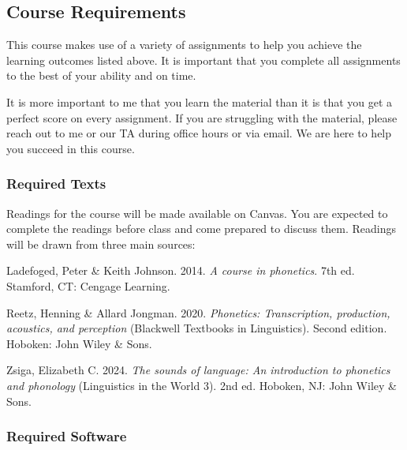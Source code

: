 \documentclass[12pt, letterpaper]{article}
\begin{document}
\subsection*{Course Requirements} \label{sec:requirements}

This course makes use of a variety of assignments to help you achieve the learning outcomes listed above. It is important that you complete all assignments to the best of your ability and on time. 

It is more important to me that you learn the material than it is that you get a perfect score on every assignment. If you are struggling with the material, please reach out to me or our TA during office hours or via email. We are here to help you succeed in this course.

\subsubsection*{Required Texts} \label{sec:texts}
Readings for the course will be made available on Canvas. You are expected to complete the readings before class and come prepared to discuss them. Readings will be drawn from three main sources: 
\begin{description}[style=multiline, leftmargin=6cm,font=\bfseries]
    \item[Ladefoged and Johnson (L\&J)] Ladefoged, Peter \& Keith Johnson. 2014. \textit{A course in phonetics}. 7th ed. Stamford, CT: Cengage Learning.
    \item[Reetz and Jongman (R\&J)] Reetz, Henning \& Allard Jongman. 2020. \textit{Phonetics: Transcription, production, acoustics, and perception} (Blackwell Textbooks in Linguistics). Second edition. Hoboken: John Wiley \& Sons.

    \item[Zsiga (Zs)] Zsiga, Elizabeth C. 2024. \textit{The sounds of language: An introduction to phonetics and phonology} (Linguistics in the World 3). 2nd ed. Hoboken, NJ: John Wiley \& Sons.
\end{description}

\subsubsection*{Required Software} \label{sec:software}
\end{document}
